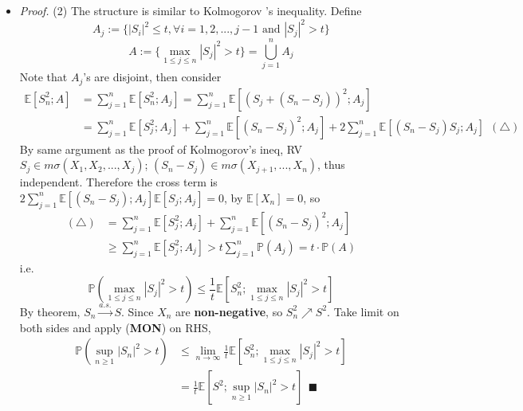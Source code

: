 \documentclass[a4paper,12pt,twoside]{book}
\begin{document}
\begin{itemize}
	\item[]\textit{Proof.} (2) The structure is similar to Kolmogorov 's inequality. Define
	\begin{equation}
		A_j:=\{|S_i|^2\leq t, \forall i=1,2,...,j-1\text{ and }|S_j|^2>t\}
	\end{equation}
	\begin{equation}
		A:=\{\max\limits_{1\leq j \leq n}|S_j|^2>t\}=\bigcup_{j=1}^{n}A_j
	\end{equation}
	Note that $A_j$'s are disjoint, then consider
	\begin{equation}
		\begin{split}
			\mathbb{E}\left[S_n^2; A\right]&=\sum_{j=1}^n\mathbb{E}\left[S_n^2;A_j\right]=\sum_{j=1}^n \mathbb{E}\left[(S_j+(S_n-S_j))^2;A_j\right]\\
			&=\sum_{j=1}^n\mathbb{E}\left[S_j^2;A_j\right]+\sum_{j=1}^n\mathbb{E}\left[(S_n-S_j)^2;A_j\right]+2\sum_{j=1}^n\mathbb{E}\left[(S_n-S_j)S_j;A_j\right]~~(\triangle)
		\end{split}
	\end{equation}
	By same argument as the proof of Kolmogorov's ineq, RV $S_j\in m\sigma(X_1, X_2, ..., X_j)$; $(S_n-S_j)\in m\sigma(X_{j+1}, ..., X_n)$, thus independent. Therefore the cross term is $2\sum_{j=1}^n\mathbb{E}\left[(S_n-S_j);A_j\right] \mathbb{E}\left[S_j;A_j\right]=0$, by $\mathbb{E}\left[X_n\right]=0$, so
	\begin{equation}
		\begin{split}
			(\triangle)&=\sum_{j=1}^n\mathbb{E}\left[S_j^2;A_j\right]+\sum_{j=1}^n\mathbb{E}\left[(S_n-S_j)^2;A_j\right]\\
			&\geq \sum_{j=1}^n\mathbb{E}\left[S_j^2;A_j\right]>t\sum_{j=1}^n \mathbb{P}\left(A_j\right)=t\cdot \mathbb{P}\left(A\right)
		\end{split}
	\end{equation}
	i.e.
	\begin{equation}
		\mathbb{P}\left(\max\limits_{1 \leq j\leq n}|S_j|^2>t\right)\leq \frac{1}{t}\mathbb{E}\left[S_n^2; \max\limits_{1 \leq j\leq n}|S_j|^2>t\right]
	\end{equation}
	By theorem, $S_n \xrightarrow{a.s.} S$. Since $X_n$ are \textbf{non-negative}, so $S_n^2\nearrow S^2$. Take limit on both sides and apply (\textbf{MON}) on RHS,
	\begin{equation}
		\begin{split}
			\mathbb{P}\left(\sup\limits_{n\geq 1}|S_n|^2>t\right)
			&\leq \lim\limits_{n\rightarrow\infty}\frac{1}{t}\mathbb{E}\left[S_n^2; \max\limits_{1 \leq j\leq n}|S_j|^2>t\right]\\
			&=\frac{1}{t}\mathbb{E}\left[S^2; \sup\limits_{n\geq 1}|S_n|^2>t\right]~~\blacksquare
		\end{split}	
	\end{equation}


\end{itemize}
\end{document}
